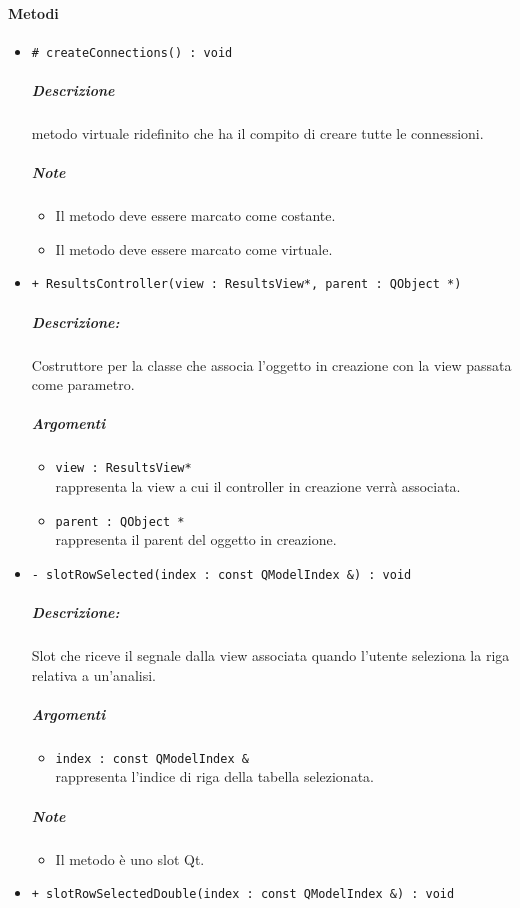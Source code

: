 	\paragraph{\color{black}Metodi}
		\begin{itemize}
			\item \color{blue} \verb!# createConnections() : void!
			\color{black}
			\subparagraph{Descrizione} metodo virtuale ridefinito che ha il compito di creare tutte le connessioni.
			\subparagraph{Note}
			\begin{itemize}
				\item Il metodo deve essere marcato come costante.
				\item Il metodo deve essere marcato come virtuale.
			\end{itemize}
			\item \color{blue} \verb!+ ResultsController(view : ResultsView*, parent : QObject *)!
			\color{black}
			\subparagraph{Descrizione:} Costruttore per la classe che associa l'oggetto in creazione con la view passata come parametro.
			\color{black}
			\subparagraph{Argomenti}
			\begin{itemize}
				\item \color{RoyalPurple} \verb!view : ResultsView*!\\				
\color{black} rappresenta la view a cui il controller in creazione verrà associata.
				\item \color{RoyalPurple} \verb!parent : QObject *!\\				
\color{black} rappresenta il parent del oggetto in creazione.
			\end{itemize}
			\item \color{blue} \verb!- slotRowSelected(index : const QModelIndex &) : void!
			\color{black}
			\subparagraph{Descrizione:} Slot\g{} che riceve il segnale dalla view associata quando l'utente seleziona la riga relativa a un'analisi.
			\color{black}
			\subparagraph{Argomenti}
			\begin{itemize}
				\item \color{RoyalPurple} \verb!index : const QModelIndex &!\\				
\color{black} rappresenta l'indice di riga della tabella selezionata.
			\end{itemize}
			\subparagraph{Note}
			\begin{itemize}
				\item Il metodo è uno slot\g{} Qt\g{}.
			\end{itemize}
			\item \color{blue} \verb!+ slotRowSelectedDouble(index : const QModelIndex &) : void!

\end{itemize}
